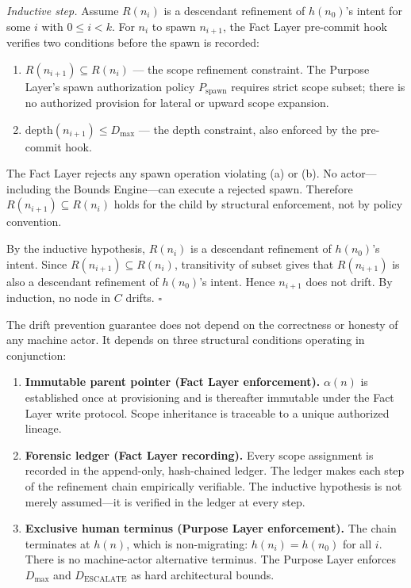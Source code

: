 \medskip
\textit{Inductive step.} Assume $R(n_i)$ is a descendant refinement of $h(n_0)$'s intent for some $i$ with $0 \leq i < k$. For $n_i$ to spawn $n_{i+1}$, the Fact Layer pre-commit hook verifies two conditions before the spawn is recorded:

\begin{enumerate}
    \item[(a)] $R(n_{i+1}) \subseteq R(n_i)$ --- the scope refinement constraint. The Purpose Layer's spawn authorization policy $P_{\mathrm{spawn}}$ requires strict scope subset; there is no authorized provision for lateral or upward scope expansion.
    \item[(b)] $\mathrm{depth}(n_{i+1}) \leq D_{\mathrm{max}}$ --- the depth constraint, also enforced by the pre-commit hook.
\end{enumerate}

The Fact Layer rejects any spawn operation violating (a) or (b). No actor---including the Bounds Engine---can execute a rejected spawn. Therefore $R(n_{i+1}) \subseteq R(n_i)$ holds for the child by structural enforcement, not by policy convention.

By the inductive hypothesis, $R(n_i)$ is a descendant refinement of $h(n_0)$'s intent. Since $R(n_{i+1}) \subseteq R(n_i)$, transitivity of subset gives that $R(n_{i+1})$ is also a descendant refinement of $h(n_0)$'s intent. Hence $n_{i+1}$ does not drift. By induction, no node in $C$ drifts. $\square$

\medskip
The drift prevention guarantee does not depend on the correctness or honesty of any machine actor. It depends on three structural conditions operating in conjunction:

\begin{enumerate}
    \item[(C1)] \textbf{Immutable parent pointer (Fact Layer enforcement).} $\alpha(n)$ is established once at provisioning and is thereafter immutable under the Fact Layer write protocol. Scope inheritance is traceable to a unique authorized lineage.
    \item[(C2)] \textbf{Forensic ledger (Fact Layer recording).} Every scope assignment is recorded in the append-only, hash-chained ledger. The ledger makes each step of the refinement chain empirically verifiable. The inductive hypothesis is not merely assumed---it is verified in the ledger at every step.
    \item[(C3)] \textbf{Exclusive human terminus (Purpose Layer enforcement).} The chain terminates at $h(n)$, which is non-migrating: $h(n_i) = h(n_0)$ for all $i$. There is no machine-actor alternative terminus. The Purpose Layer enforces $D_{\mathrm{max}}$ and $D_{\mathrm{ESCALATE}}$ as hard architectural bounds.
\end{enumerate}

